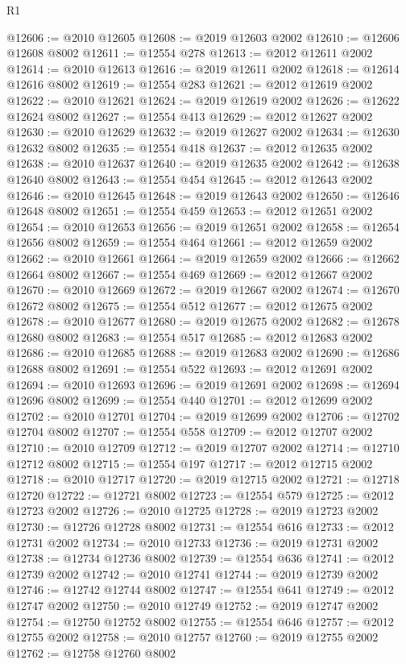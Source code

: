 \begin{lexlean}{R1}
\begin{coremodule}
@12606 := @2010 @12605
@12608 := @2019 @12603 @2002
@12610 := @12606 @12608 @8002
@12611 := @12554 @278
@12613 := @2012 @12611 @2002
@12614 := @2010 @12613
@12616 := @2019 @12611 @2002
@12618 := @12614 @12616 @8002
@12619 := @12554 @283
@12621 := @2012 @12619 @2002
@12622 := @2010 @12621
@12624 := @2019 @12619 @2002
@12626 := @12622 @12624 @8002
@12627 := @12554 @413
@12629 := @2012 @12627 @2002
@12630 := @2010 @12629
@12632 := @2019 @12627 @2002
@12634 := @12630 @12632 @8002
@12635 := @12554 @418
@12637 := @2012 @12635 @2002
@12638 := @2010 @12637
@12640 := @2019 @12635 @2002
@12642 := @12638 @12640 @8002
@12643 := @12554 @454
@12645 := @2012 @12643 @2002
@12646 := @2010 @12645
@12648 := @2019 @12643 @2002
@12650 := @12646 @12648 @8002
@12651 := @12554 @459
@12653 := @2012 @12651 @2002
@12654 := @2010 @12653
@12656 := @2019 @12651 @2002
@12658 := @12654 @12656 @8002
@12659 := @12554 @464
@12661 := @2012 @12659 @2002
@12662 := @2010 @12661
@12664 := @2019 @12659 @2002
@12666 := @12662 @12664 @8002
@12667 := @12554 @469
@12669 := @2012 @12667 @2002
@12670 := @2010 @12669
@12672 := @2019 @12667 @2002
@12674 := @12670 @12672 @8002
@12675 := @12554 @512
@12677 := @2012 @12675 @2002
@12678 := @2010 @12677
@12680 := @2019 @12675 @2002
@12682 := @12678 @12680 @8002
@12683 := @12554 @517
@12685 := @2012 @12683 @2002
@12686 := @2010 @12685
@12688 := @2019 @12683 @2002
@12690 := @12686 @12688 @8002
@12691 := @12554 @522
@12693 := @2012 @12691 @2002
@12694 := @2010 @12693
@12696 := @2019 @12691 @2002
@12698 := @12694 @12696 @8002
@12699 := @12554 @440
@12701 := @2012 @12699 @2002
@12702 := @2010 @12701
@12704 := @2019 @12699 @2002
@12706 := @12702 @12704 @8002
@12707 := @12554 @558
@12709 := @2012 @12707 @2002
@12710 := @2010 @12709
@12712 := @2019 @12707 @2002
@12714 := @12710 @12712 @8002
@12715 := @12554 @197
@12717 := @2012 @12715 @2002
@12718 := @2010 @12717
@12720 := @2019 @12715 @2002
@12721 := @12718 @12720
@12722 := @12721 @8002
@12723 := @12554 @579
@12725 := @2012 @12723 @2002
@12726 := @2010 @12725
@12728 := @2019 @12723 @2002
@12730 := @12726 @12728 @8002
@12731 := @12554 @616
@12733 := @2012 @12731 @2002
@12734 := @2010 @12733
@12736 := @2019 @12731 @2002
@12738 := @12734 @12736 @8002
@12739 := @12554 @636
@12741 := @2012 @12739 @2002
@12742 := @2010 @12741
@12744 := @2019 @12739 @2002
@12746 := @12742 @12744 @8002
@12747 := @12554 @641
@12749 := @2012 @12747 @2002
@12750 := @2010 @12749
@12752 := @2019 @12747 @2002
@12754 := @12750 @12752 @8002
@12755 := @12554 @646
@12757 := @2012 @12755 @2002
@12758 := @2010 @12757
@12760 := @2019 @12755 @2002
@12762 := @12758 @12760 @8002

\end{coremodule}
\end{lexlean}
